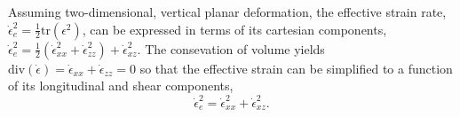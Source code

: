 \documentclass[utf8]{article}
\begin{document}
    Assuming two-dimensional, vertical planar deformation, the effective strain
    rate, $\dot\epsilon_e^2 = \frac{1}{2}\mathrm{tr}(\epsilon^2)$, can be
    expressed in terms of its cartesian components, $\dot\epsilon_e^2 =
    \frac{1}{2}(\dot\epsilon_{xx}^2 + \dot\epsilon_{zz}^2) +
    \dot\epsilon_{xz}^2$. The consevation of volume yields
    $\mathrm{div}(\dot\epsilon) = \dot\epsilon_{xx} + \dot\epsilon_{zz} = 0$ so
    that the effective strain can be simplified to a function of its
    longitudinal and shear components, \begin{equation}
        \dot\epsilon_e^2 = \dot\epsilon_{xx}^2 + \dot\epsilon_{xz}^2.
    \end{equation}












\end{document}
